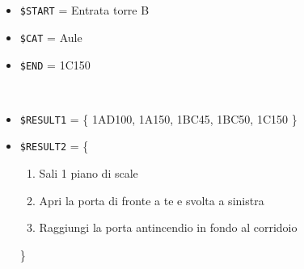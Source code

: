 \documentclass[../../SperimentazioniPratiche.tex]{subfiles}
\begin{document}
			\paragraph*{}
			\label{Prova1A.2}	
			\begin{tcolorbox}[fonttitle=\bfseries, 
								adjusted title={\Large Prova 1A.2}, 
								breakable, 
								sharp corners=south,
								colback=white, 
								colframe=white!60!black]
								
				\begin{description}[leftmargin=0.7cm,labelwidth=!]
				
					\item[Input] \ \par 
        				\begin{itemize}
        					\item \verb|$START| = Entrata torre B
        					\item \verb|$CAT| = Aule
							\item \verb|$END| = 1C150
        				\end{itemize}
        				
        			\tcbline 
        				
        			\item[Output atteso] \ \par
        				\begin{itemize}
        				
        					\item \verb|$RESULT1| = \{
        						1AD100, 1A150, 1BC45, 1BC50, 1C150
        					\}
        				
        					\item \verb|$RESULT2| = \{
        					\begin{enumerate}
        						\item Sali 1 piano di scale
								\item Apri la porta di fronte a te e svolta a sinistra
								\item Raggiungi la porta antincendio in fondo al corridoio
								
        					\end{enumerate}
        					\}
        					
        					
        					
        				\end{itemize}

					\tcbline        				
        				
        			\item[Output riscontrato] \ \par
        				\begin{description}
        				

\end{description}
\end{description}
\end{tcolorbox}
\end{document}
